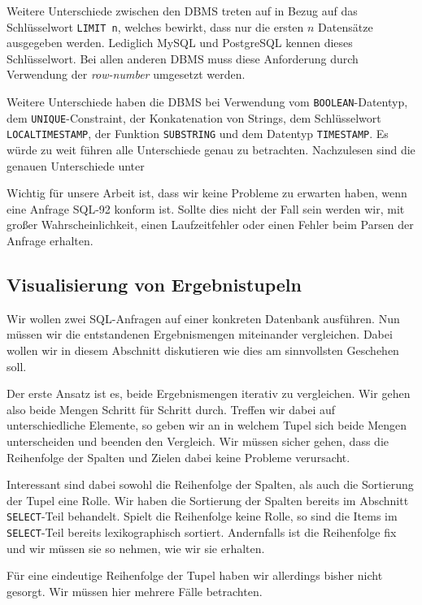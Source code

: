 Weitere Unterschiede zwischen den DBMS treten auf in Bezug auf das Schlüsselwort \verb|LIMIT n|, welches bewirkt, dass nur die ersten $n$ Datensätze ausgegeben werden. Lediglich MySQL und PostgreSQL kennen dieses Schlüsselwort. Bei allen anderen DBMS muss diese Anforderung durch Verwendung der \textit{row-number} umgesetzt werden. 

Weitere Unterschiede haben die DBMS bei Verwendung vom \verb|BOOLEAN|-Datentyp, dem \verb|UNIQUE|-Constraint, der Konkatenation von Strings, dem Schlüsselwort \verb|LOCALTIMESTAMP|, der Funktion \verb|SUBSTRING| und dem Datentyp \verb|TIMESTAMP|. Es würde zu weit führen alle Unterschiede genau zu betrachten. Nachzulesen sind die genauen Unterschiede unter \cite{sqldiff1}

Wichtig für unsere Arbeit ist, dass wir keine Probleme zu erwarten haben, wenn eine Anfrage SQL-92 konform ist. Sollte dies nicht der Fall sein werden wir, mit großer Wahrscheinlichkeit, einen Laufzeitfehler oder einen Fehler beim Parsen der Anfrage erhalten.

\subsection{Visualisierung von Ergebnistupeln}

Wir wollen zwei SQL-Anfragen auf einer konkreten Datenbank ausführen. Nun müssen wir die entstandenen Ergebnismengen miteinander vergleichen. Dabei wollen wir in diesem Abschnitt diskutieren wie dies am sinnvollsten Geschehen soll. 

Der erste Ansatz ist es, beide Ergebnismengen iterativ zu vergleichen. Wir gehen also beide Mengen Schritt für Schritt durch. Treffen wir dabei auf unterschiedliche Elemente, so geben wir an in welchem Tupel sich beide Mengen unterscheiden und beenden den Vergleich. Wir müssen sicher gehen, dass die Reihenfolge der Spalten und Zielen dabei keine Probleme verursacht.

Interessant sind dabei sowohl die Reihenfolge der Spalten, als auch die Sortierung der Tupel eine Rolle. Wir haben die Sortierung der Spalten bereits im Abschnitt \verb|SELECT|-Teil behandelt. Spielt die Reihenfolge keine Rolle, so sind die Items im \verb|SELECT|-Teil bereits lexikographisch sortiert. Andernfalls ist die Reihenfolge fix und wir müssen sie so nehmen, wie wir sie erhalten.

Für eine eindeutige Reihenfolge der Tupel haben wir allerdings bisher nicht gesorgt. Wir müssen hier mehrere Fälle betrachten. 

